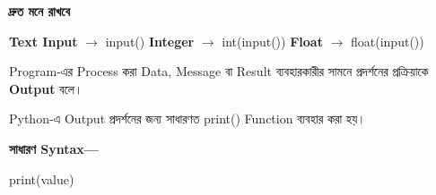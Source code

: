 \begin{rememberbox}

\textbf{\color{deepOrange}দ্রুত মনে রাখবে}

\begin{center}

\textbf{Text Input}
\(\longrightarrow\)
\textenglish{\ttfamily input()}
\qquad
\textbf{Integer}
\(\longrightarrow\)
\textenglish{\ttfamily int(input())}
\qquad
\textbf{Float}
\(\longrightarrow\)
\textenglish{\ttfamily float(input())}

\end{center}

\end{rememberbox}



\begin{definitionbox}
Program-এর Process করা Data, Message বা Result ব্যবহারকারীর
সামনে প্রদর্শনের প্রক্রিয়াকে \textbf{Output} বলে।
\end{definitionbox}

Python-এ Output প্রদর্শনের জন্য সাধারণত
\textenglish{\ttfamily print()}
Function ব্যবহার করা হয়।

\textbf{সাধারণ Syntax—}

\begin{codebox}
\begin{english}
\ttfamily
print(value)
\end{english}
\end{codebox}



